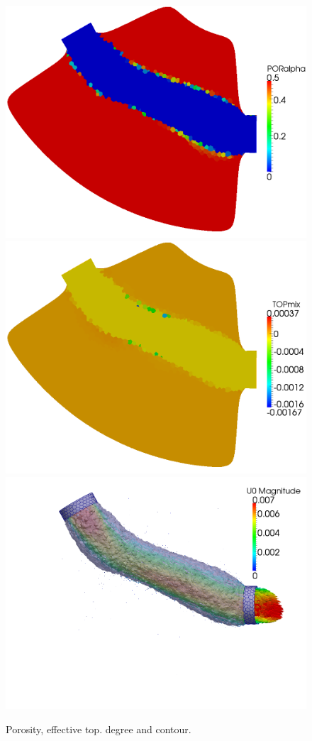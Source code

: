 \documentclass[oneside]{article}
\numberwithin{equation}{section}
\numberwithin{figure}{section}
\numberwithin{figure}{section}
\begin{document}
\begin{figure}[htbp]
    \centering
    \includegraphics[scale=0.11]{S200por8.png}
    \includegraphics[scale=0.11]{S200top7.png}
    \includegraphics[scale=0.11]{S200con7.png}
    \caption{Porosity, effective top. degree and contour.} 
    \label{fig:paraviewTopo}
\end{figure}
\end{document}
